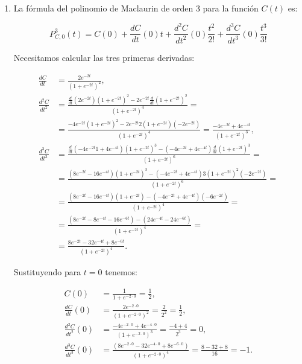 \documentclass[
  spanish,
  a4paper,
]{scrreport}
\theoremstyle{definition}
\theoremstyle{remark}
\begin{document}
\begin{tcolorbox}[enhanced jigsaw, arc=.35mm, bottomrule=.15mm, bottomtitle=1mm, breakable, colback=white, colbacktitle=quarto-callout-tip-color!10!white, colframe=quarto-callout-tip-color-frame, coltitle=black, left=2mm, leftrule=.75mm, opacityback=0, opacitybacktitle=0.6, rightrule=.15mm, title=\textcolor{quarto-callout-tip-color}{\faLightbulb}\hspace{0.5em}{Solución}, titlerule=0mm, toprule=.15mm, toptitle=1mm]

\begin{enumerate}
\def\labelenumi{\alph{enumi}.}
\item
  La fórmula del polinomio de Maclaurin de orden 3 para la función
  \(C(t)\) es:

  \[
   P_{C,0}^3(t)=C(0)+\frac{dC}{dt}(0)t+\frac{d^2C}{dt^2}(0)\frac{t^2}{2!}+\frac{d^3C}{dt^3}(0)\frac{t^3}{3!}
   \]

  Necesitamos calcular las tres primeras derivadas:

  \begin{align*}
   \frac{dC}{dt} &= \frac{2e^{-2t}}{(1+e^{-2t})^2},\\
   \frac{d^2C}{dt^2} &=
   \frac{\frac{d}{dt}(2e^{-2t})(1+e^{-2t})^2-2e^{-2t}\frac{d}{dt}(1+e^{-2t})^2}{(1+e^{-2t})^4} =\\
   &= \frac{-4e^{-2t}(1+e^{-2t})^2- 2e^{-2t}2(1+e^{-2t})(-2e^{-2t})}{(1+e^{-2t})^4}
   = \frac{-4e^{-2t}+4e^{-4t}}{(1+e^{-2t})^3},\\
   \frac{d^3C}{dt^3}
   &=
   \frac{\frac{d}{dt}(-4e^{-2t}1+4e^{-4t})(1+e^{-2t})^3-(-4e^{-2t}+4e^{-4t})\frac{d}{dt}(1+e^{-2t})^3}{(1+e^{-2t})^6}=\\
   &=
   \frac{(8e^{-2t}-16e^{-4t})(1+e^{-2t})^3-(-4e^{-2t}+4e^{-4t})3(1+e^{-2t})^2(-2e^{-2t})}{(1+e^{-2t})^6}=\\
   &=
   \frac{(8e^{-2t}-16e^{-4t})(1+e^{-2t})-(-4e^{-2t}+4e^{-4t})(-6e^{-2t})}{(1+e^{-2t})^4}=\\
   &=
   \frac{(8e^{-2t}-8e^{-4t}-16e^{-6t})-(24e^{-4t}-24e^{-6t})}{(1+e^{-2t})^4}=\\
   &=
   \frac{8e^{-2t}-32e^{-4t}+8e^{-6t}}{(1+e^{-2t})^4}.
   \end{align*}

  Sustituyendo para \(t=0\) tenemos:

  \begin{align*}
   C(0)&= \frac{1}{1+e^{-2\cdot 0}}=\frac{1}{2},\\
   \frac{dC}{dt}(0) &= \frac{2e^{-2\cdot 0}}{(1+e^{-2\cdot 0})^2} = \frac{2}{2^2}=\frac{1}{2},\\
   \frac{d^2C}{dt^2}(0) &= \frac{-4e^{-2\cdot 0}+4e^{-4\cdot 0}}{(1+e^{-2\cdot
   0})^3} = \frac{-4+4}{2^3}= 0,\\
   \frac{d^3C}{dt^3}(0)&=\frac{(8e^{-2\cdot 0}-32e^{-4\cdot 0}+8e^{-6\cdot 0})}{(1+e^{-2\cdot 0})^4}=\frac{8-32+8}{16}=-1.
   \end{align*}


\end{enumerate}
\end{tcolorbox}
\end{document}
